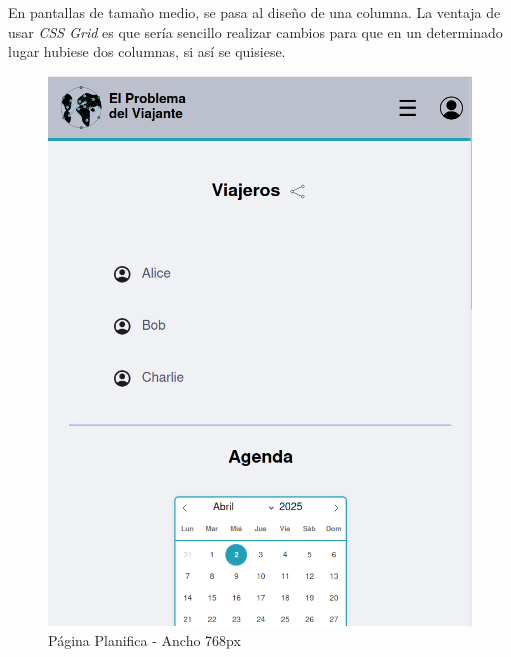 \documentclass[11pt, a4paper]{book}
\begin{document}
	En pantallas de tamaño medio, se pasa al diseño de una columna. La ventaja de usar \textit{CSS Grid} es que sería sencillo realizar cambios para que en un determinado lugar hubiese dos columnas, si así se quisiese.
	
	\begin{figure} [H]
		\centering
		\includegraphics[height=0.4\textheight]{CSS/2-5 768.png}
		\caption{Página Planifica - Ancho 768px}
	\end{figure}
\end{document}
